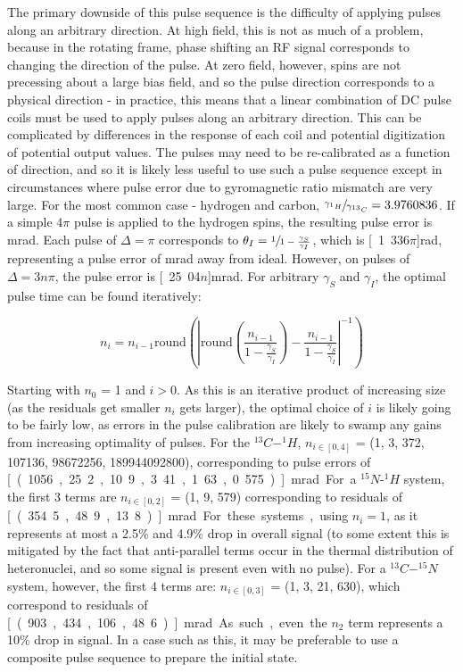 \documentclass[PaulGanssle-Thesis.tex]{subfiles}
\begin{document}
The primary downside of this pulse sequence is the difficulty of applying pulses along an arbitrary direction. At high field, this is not as much of a problem, because in the rotating frame, phase shifting an RF signal corresponds to changing the direction of the pulse. At zero field, however, spins are not precessing about a large bias field, and so the pulse direction corresponds to a physical direction - in practice, this means that a linear combination of DC pulse coils must be used to apply pulses along an arbitrary direction. This can be complicated by differences in the response of each coil and potential digitization of potential output values. The pulses may need to be re-calibrated as a function of direction, and so it is likely less useful to use such a pulse sequence except in circumstances where pulse error due to gyromagnetic ratio mismatch are very large. For the most common case - hydrogen and carbon, $\sfrac{\gamma_{^{1}H}}{\gamma_{^{13}C}} = 3.9760836$. If a simple $4\pi$ pulse is applied to the hydrogen spins, the resulting pulse error is \unit[6]{mrad}. Each pulse of $\Delta = \pi$ corresponds to $\theta_{I} = \sfrac{1}{1-\frac{\gamma_{S}}{\gamma_{I}}}$, which is \unit[1.336$\pi$]{rad}, representing a pulse error of \unit[336]{mrad} away from ideal. However, on pulses of $\Delta = 3n\pi$, the pulse error is \unit[25.04$n$]{mrad}. For arbitrary $\gamma_{S}$ and $\gamma_{I}$, the optimal pulse time can be found iteratively:

\begin{equation}
\label{eqn:JcouplingOptimalNIteration}
n_i = n_{i-1}\mathrm{round}\left(\left|\mathrm{round}\left(\frac{n_{i-1}}{1-\frac{\gamma_{S}}{\gamma_{I}}}\right) - \frac{n_{i-1}}{1-\frac{\gamma_{S}}{\gamma_{I}}}\right|^{-1}\right)
\end{equation}

Starting with $n_0$ = 1 and $i > 0$. As this is an iterative product of increasing size (as the residuals get smaller $n_{i}$ gets larger), the optimal choice of $i$ is likely going to be fairly low, as errors in the pulse calibration are likely to swamp any gains from increasing optimality of pulses. For the $^{13}C-^{1}H$, $n_{i\in[0,4]}$ = (1, 3, 372, 107136, 98672256, 189944092800), corresponding to pulse errors of \unit[(1056, 25.2, 10.9, 3.41, 1.63, 0.575)]{mrad}. For a $^{15}N$-$^{1}H$ system, the first 3 terms are $n_{i\in[0,2]}$ = (1, 9, 579) corresponding to residuals of \unit[(354.5, 48.9, 13.8)]{mrad}. For these systems, using $n_{i} = 1$, as it represents at most a 2.5\% and 4.9\% drop in overall signal (to some extent this is mitigated by the fact that anti-parallel terms occur in the thermal distribution of heteronuclei, and so some signal is present even with no pulse). For a $^{13}C-^{15}N$ system, however, the first 4 terms are: $n_{i\in[0,3]}$ = (1, 3, 21, 630), which correspond to residuals of \unit[(903, 434, 106, 48.6)]{mrad}. As such, even the $n_{2}$ term represents a 10\% drop in signal. In a case such as this, it may be preferable to use a composite pulse sequence to prepare the initial state.
\end{document}
